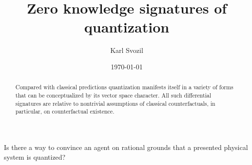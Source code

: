\documentclass[%
  reprint,
  twocolumn,
  preprint,
 showpacs,
 showkeys,
 preprintnumbers,
 nofootinbib,
 amsmath,amssymb,
 aps,
 pra,
  longbibliography,
 ]{revtex4-2}
\begin{document}
\title{Zero knowledge signatures of quantization}


\author{Karl Svozil}



\date{\today}


\begin{abstract}
Compared with classical predictions quantization manifests itself in a variety of forms that can be conceptualized by its vector space character. All such differential signatures are relative to nontrivial assumptions of classical counterfactuals, in particular, on counterfactual existence.
\end{abstract}

Is there a way to convince an agent on rational grounds that a presented physical system is quantized?

\maketitle
\end{document}
